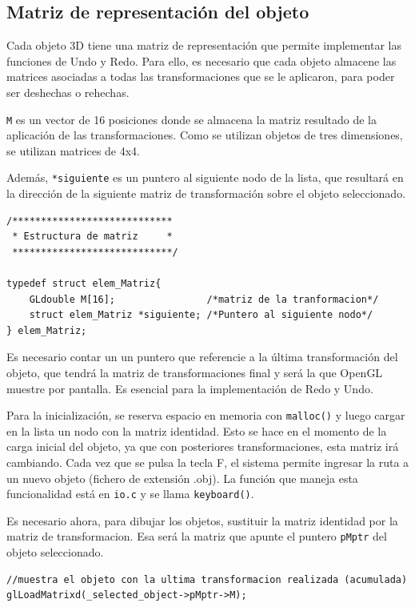\documentclass[12pt,a4paper]{article}
\begin{document}
\subsection{Matriz de representación del objeto}

Cada objeto 3D tiene una matriz de representación que permite implementar las funciones de Undo y Redo. Para ello, es necesario que cada objeto almacene las matrices asociadas a todas las transformaciones que se le aplicaron, para poder ser deshechas o rehechas. 

\texttt{M} es un vector de 16 posiciones donde se almacena la matriz resultado de la aplicación de las transformaciones.  Como se utilizan objetos de tres dimensiones, se utilizan matrices de 4x4.

Además, \texttt{*siguiente} es un puntero al siguiente nodo de la lista, que resultará en la dirección de la siguiente matriz de transformación sobre el objeto seleccionado.

\begin{lstlisting}
/****************************
 * Estructura de matriz     *
 ****************************/

typedef struct elem_Matriz{
    GLdouble M[16];                /*matriz de la tranformacion*/
    struct elem_Matriz *siguiente; /*Puntero al siguiente nodo*/
} elem_Matriz;

\end{lstlisting}

Es necesario contar un un puntero que referencie a la última transformación del objeto, que tendrá la matriz de transformaciones final y será la que OpenGL muestre por pantalla. Es esencial para la implementación de Redo y Undo.

Para la inicialización, se reserva espacio en memoria con \texttt{malloc()} y luego cargar en la lista un nodo con la matriz identidad. Esto se hace en el momento de la carga inicial del objeto, ya que con posteriores transformaciones, esta matriz irá cambiando. Cada vez que se pulsa la tecla F, el sistema permite ingresar la ruta a un nuevo objeto (fichero de extensión .obj). La función que maneja esta funcionalidad está en \texttt{io.c} y se llama \texttt{keyboard()}.

Es necesario ahora, para dibujar los objetos, sustituir la matriz identidad por la matriz de transformacion. Esa será la matriz que apunte el puntero \texttt{pMptr} del objeto seleccionado.

\vspace{0.5cm}
\begin{lstlisting}
//muestra el objeto con la ultima transformacion realizada (acumulada)
glLoadMatrixd(_selected_object->pMptr->M);

\end{lstlisting}
\end{document}
